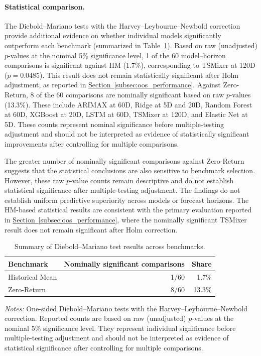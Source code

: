 \documentclass[runningheads,orivec]{llncs}
\begin{document}
\paragraph{Statistical comparison.} The Diebold--Mariano tests with the Harvey--Leybourne--Newbold correction provide additional evidence on whether individual models significantly outperform each benchmark (summarized in Table~\ref{tab:dm_benchmark_summary}). Based on raw (unadjusted) $p$-values at the nominal 5\% significance level, 1 of the 60 model--horizon comparisons is significant against HM (1.7\%), corresponding to TSMixer at 120D ($p = 0.0485$). This result does not remain statistically significant after Holm adjustment, as reported in \hyperref[subsec:oos_performance]{Section~\ref*{subsec:oos_performance}}. Against Zero-Return, 8 of the 60 comparisons are nominally significant based on raw $p$-values (13.3\%). These include ARIMAX at 60D, Ridge at 5D and 20D, Random Forest at 60D, XGBoost at 20D, LSTM at 60D, TSMixer at 120D, and Elastic Net at 5D. These counts represent nominal significance before multiple-testing adjustment and should not be interpreted as evidence of statistically significant improvements after controlling for multiple comparisons.

The greater number of nominally significant comparisons against Zero-Return suggests that the statistical conclusions are also sensitive to benchmark selection. However, these raw $p$-value counts remain descriptive and do not establish statistical significance after multiple-testing adjustment. The findings do not establish uniform predictive superiority across models or forecast horizons. The HM-based statistical results are consistent with the primary evaluation reported in \hyperref[subsec:oos_performance]{Section~\ref*{subsec:oos_performance}}, where the nominally significant TSMixer result does not remain significant after Holm correction.

\begin{table}[htbp]
\centering
\caption{Summary of Diebold--Mariano test results across benchmarks.}\label{tab:dm_benchmark_summary}
{\small
\setlength{\tabcolsep}{8pt}
\begin{tabular}{lrr}
\hline
Benchmark & Nominally significant comparisons & Share \\
\hline
Historical Mean & 1/60 & 1.7\% \\
Zero-Return     & 8/60 & 13.3\% \\
\hline
\end{tabular}}
\par\vspace{4pt}\parbox{0.8\linewidth}{\linespread{1.2}\selectfont\footnotesize\textit{Notes:} One-sided Diebold--Mariano tests with the Harvey--Leybourne--Newbold correction. Reported counts are based on raw (unadjusted) $p$-values at the nominal 5\% significance level. They represent individual significance before multiple-testing adjustment and should not be interpreted as evidence of statistical significance after controlling for multiple comparisons.\par}
\end{table}
\end{document}
